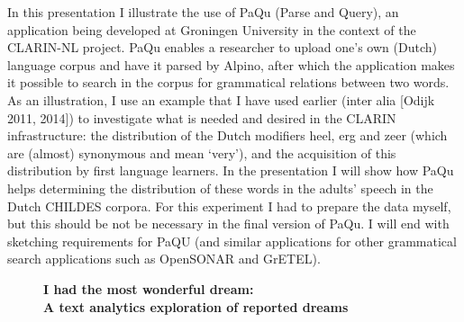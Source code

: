 \documentclass[10pt, a4paper, twopage, headinclude, footinclude, BCOR5mm]{scrartcl}
\begin{document}
\noindent
In this presentation I illustrate the use of PaQu (Parse and Query), an application being developed at Groningen University in the context of the CLARIN-NL project. PaQu enables a researcher to upload one’s own (Dutch) language corpus and have it parsed by Alpino, after which the application makes it possible to search in the corpus for grammatical relations between two words. As an illustration, I use an example that I have used earlier (inter alia [Odijk 2011, 2014]) to investigate what is needed and desired in the CLARIN infrastructure: the distribution of the Dutch modifiers heel, erg and zeer (which are (almost) synonymous and mean `very’), and the acquisition of this distribution by first language learners. In the presentation I will show how PaQu helps determining the distribution of these words in the adults’ speech in the Dutch CHILDES corpora. For this experiment I had to prepare the data myself, but this should be not be necessary in the final version of PaQu. I will end with sketching requirements for PaQU (and similar applications for other grammatical search applications such as OpenSONAR and GrETEL).


\newpage

\begin{figure}[t!]
\centering
\large\textbf{I had the most wonderful dream: \\ A text analytics exploration of reported dreams}
\vspace*{0.5cm}
\end{figure}
\end{document}
